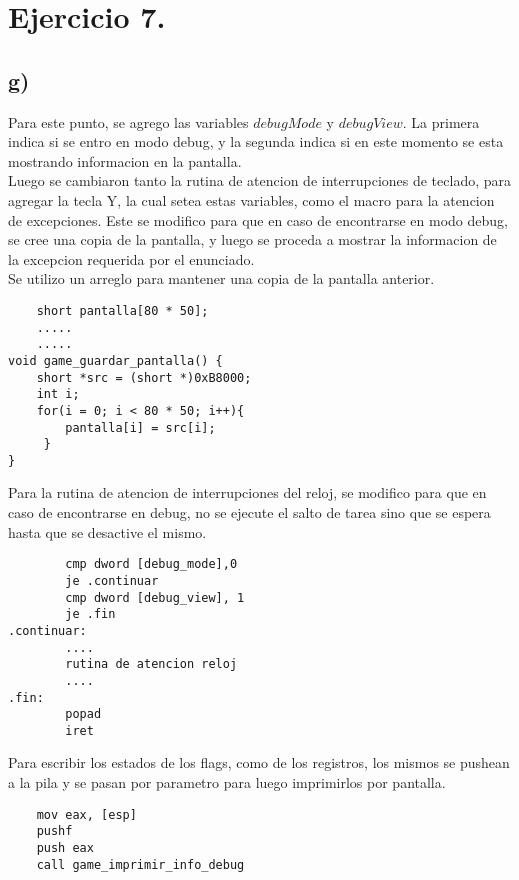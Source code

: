 \section{Ejercicio 7.}

\subsection*{g)}

\noindent Para este punto, se agrego las variables $debugMode$ y $debugView$. La primera indica si se entro en modo debug, y la segunda indica si en este momento se esta mostrando informacion en la pantalla. \\

\noindent Luego se cambiaron tanto la rutina de atencion de interrupciones de teclado, para agregar la tecla Y, la cual setea estas variables, como el macro para la atencion de excepciones. Este se modifico para que en caso de encontrarse en modo debug, se cree una copia de la pantalla, y luego se proceda a mostrar la informacion de la excepcion requerida por el enunciado. \\

\noindent Se utilizo un arreglo para mantener una copia de la pantalla anterior.

\begin{codesnippet}
\begin{verbatim}
    short pantalla[80 * 50];
    .....
    .....
void game_guardar_pantalla() {
    short *src = (short *)0xB8000;
    int i;
    for(i = 0; i < 80 * 50; i++){
        pantalla[i] = src[i];
     }
}
\end{verbatim}
\end{codesnippet}

\noindent Para la rutina de atencion de interrupciones del reloj, se modifico para que en caso de encontrarse en debug, no se ejecute el salto de tarea sino que se espera hasta que se desactive el mismo.
\begin{codesnippet}
\begin{verbatim}
        cmp dword [debug_mode],0
        je .continuar
        cmp dword [debug_view], 1
		je .fin
.continuar:
        ....
        rutina de atencion reloj
        ....
.fin:
        popad  
        iret
\end{verbatim}
\end{codesnippet}

\noindent Para escribir los estados de los flags, como de los registros, los mismos se pushean a la pila y se pasan por parametro para luego imprimirlos por pantalla.

\begin{codesnippet}
\begin{verbatim}
    mov eax, [esp]
    pushf 									
    push eax
    call game_imprimir_info_debug
\end{verbatim}
\end{codesnippet}
